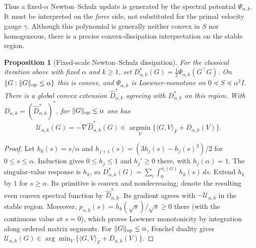 \documentclass{article}
\newtheorem{proposition}[theorem]{Proposition}
\begin{document}
Thus a fixed-$\alpha$ Newton--Schulz update is generated by the spectral
potential $\Psi_{\alpha,k}$. It must be interpreted on the \emph{force}
side, not substituted for the primal velocity gauge $\gamma$.
Although this polynomial is generally neither convex in $S$ nor homogeneous,
there is a precise convex-dissipation interpretation on the stable region.

\begin{proposition}[Fixed-scale Newton--Schulz dissipation]
\label{prop:ns-dissipation}
For the classical iteration above with fixed $\alpha$ and $k\ge1$, set
$D_{\alpha,k}^*(G)=\frac12\Psi_{\alpha,k}(G^\top G)$.
On $\{G:\|G\|_{\rm op}\le\alpha\}$ this is convex, and
$\Psi_{\alpha,k}$ is Loewner-monotone on $0\preceq S\preceq\alpha^2I$.
There is a global convex extension $\widehat D_{\alpha,k}^*$ agreeing with
$D_{\alpha,k}^*$ on this region. With
$D_{\alpha,k}=(\widehat D_{\alpha,k}^*)^*$, for
$\|G\|_{\rm op}\le\alpha$ one has
\[
 \mathcal U_{\alpha,k}(G)=-\nabla\widehat D_{\alpha,k}^*(G)
 \in\operatorname*{argmin}_V
 \{\langle G,V\rangle_F+D_{\alpha,k}(V)\}.
\]
\end{proposition}
\begin{proof}
Let $h_0(s)=s/\alpha$ and
$h_{j+1}(s)=(3h_j(s)-h_j(s)^3)/2$ for $0\le s\le\alpha$.
Induction gives $0\le h_j\le1$ and $h_j'\ge0$ there, with
$h_j(\alpha)=1$. The singular-value response is $h_k$, so
$D_{\alpha,k}^*(G)=\sum_i\int_0^{\sigma_i(G)}h_k(s)\,ds$.
Extend $h_k$ by $1$ for $s\ge\alpha$. Its primitive is convex and
nondecreasing; denote the resulting even convex spectral function by
$\widehat D_{\alpha,k}^*$.
Its gradient agrees with $-\mathcal U_{\alpha,k}$ in the stable region.
Moreover, $p_{\alpha,k}(s)=h_k(\sqrt{s})/\sqrt{s}\ge0$ there
(with the continuous value at $s=0$),
which proves Loewner monotonicity by integration along ordered matrix
segments. For $\|G\|_{\rm op}\le\alpha$, Fenchel duality gives
$\mathcal U_{\alpha,k}(G)\in\arg\min_V
\{\langle G,V\rangle_F+D_{\alpha,k}(V)\}$.
\end{proof}
\end{document}
